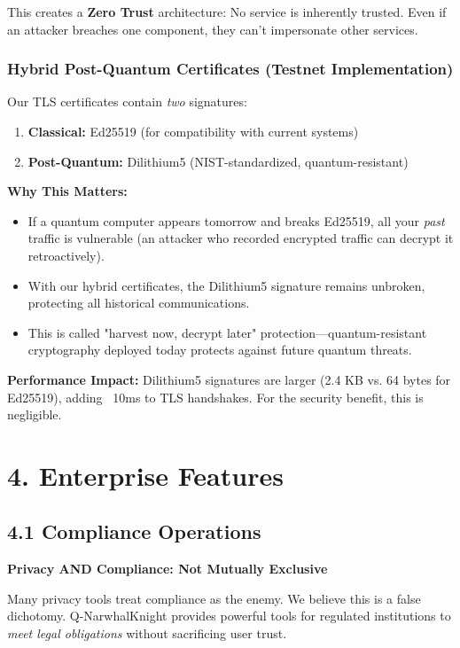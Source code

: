 \documentclass[11pt,a4paper]{article}
\begin{document}
This creates a \textbf{Zero Trust} architecture: No service is inherently trusted. Even if an attacker breaches one component, they can't impersonate other services.

\subsubsection{Hybrid Post-Quantum Certificates (Testnet Implementation)}

Our TLS certificates contain \textit{two} signatures:
\begin{enumerate}
    \item \textbf{Classical:} Ed25519 (for compatibility with current systems)
    \item \textbf{Post-Quantum:} Dilithium5 (NIST-standardized, quantum-resistant)
\end{enumerate}

\textbf{Why This Matters:}
\begin{itemize}
    \item If a quantum computer appears tomorrow and breaks Ed25519, all your \textit{past} traffic is vulnerable (an attacker who recorded encrypted traffic can decrypt it retroactively).

    \item With our hybrid certificates, the Dilithium5 signature remains unbroken, protecting all historical communications.

    \item This is called "harvest now, decrypt later" protection—quantum-resistant cryptography deployed today protects against future quantum threats.
\end{itemize}

\textbf{Performance Impact:} Dilithium5 signatures are larger (2.4 KB vs. 64 bytes for Ed25519), adding ~10ms to TLS handshakes. For the security benefit, this is negligible.

\section{4. Enterprise Features}

\subsection{4.1 Compliance Operations}

\textbf{Privacy AND Compliance: Not Mutually Exclusive}

Many privacy tools treat compliance as the enemy. We believe this is a false dichotomy. Q-NarwhalKnight provides powerful tools for regulated institutions to \textit{meet legal obligations} without sacrificing user trust.
\end{document}
